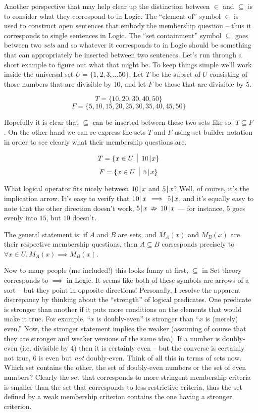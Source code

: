 \newpage

Another perspective that may help clear up the distinction between
$\in$ and $\subseteq$ is to consider what they correspond to in Logic.
The ``element of'' symbol $\in$ is used to construct open sentences
that embody the membership question -- thus it corresponds to single
sentences in Logic.  The ``set containment'' symbol $\subseteq$ goes
between two \emph{sets} and so whatever it corresponds to in Logic
should be something that can appropriately be inserted between two
sentences. Let's run through a short example to figure out what that
might be.   To keep things
simple we'll work inside the universal set $U=\{ 1, 2, 3, \ldots 50 \}$.
Let $T$ be the subset of $U$ consisting of those numbers that are 
divisible by 10, and let $F$ be those that are divisible by 5.

\[ T = \{10, 20, 30, 40, 50 \} \]
\[ F = \{5, 10, 15, 20, 25, 30, 35, 40, 45, 50 \} \]

Hopefully it is clear that $\subseteq$ can be inserted between these two sets
like so: $T \subseteq F$.  
On the other hand we can re-express the sets $T$ and $F$ using set-builder
notation in order to see clearly what their membership questions are.

\[ T = \{ x \in U \; \suchthat \; 10\divides x \} \]
\[ F = \{ x \in U \; \suchthat \; 5\divides x \} \]

What logical operator fits nicely between $10\!\mid\! x$ and $5\!\mid\! x$?
Well, of course, it's the implication arrow.  It's easy to
verify that $10\!\mid\! x \, \implies \, 5\!\mid\! x$, and it's equally easy
to note that the other direction doesn't work, $5\!\mid\! x \, \nRightarrow \, 10\!\mid\! x$ --- for instance, $5$ goes evenly into $15$, but $10$ doesn't.
 
The general statement is: if $A$ and $B$ are sets, and $M_A(x)$ and $M_B(x)$ 
are their respective membership questions, then $A \subseteq B$ corresponds
precisely to $\forall x \in U, M_A(x) \implies M_B(x)$.

    
Now to many people (me included!) this looks funny at first, $\subseteq$
in Set theory corresponds to $\implies$ in Logic.  It seems like both
of these symbols are arrows of a sort -- but they point in opposite
directions!  Personally, I resolve the apparent discrepancy by thinking
about the ``strength'' of logical predicates.  One predicate is stronger
than another if it puts more conditions on the elements that would make
it true.  For example, ``$x$ is doubly-even'' is stronger than 
``$x$ is (merely) even.''   Now, the stronger statement implies the weaker
(assuming of course that they are stronger and weaker versions of the 
same idea).  If a number is doubly-even (i.e. divisible by 4) then it
is certainly even -- but the converse is certainly not true, $6$ is even
but \emph{not} doubly-even.  Think of all this in terms of sets now.
Which set contains the other, the set of doubly-even numbers or the set
of even numbers?   Clearly the set that corresponds to more stringent
membership criteria is smaller than the set that corresponds
to less restrictive criteria, thus the set defined by a weak membership
criterion contains the one having a stronger criterion.  

